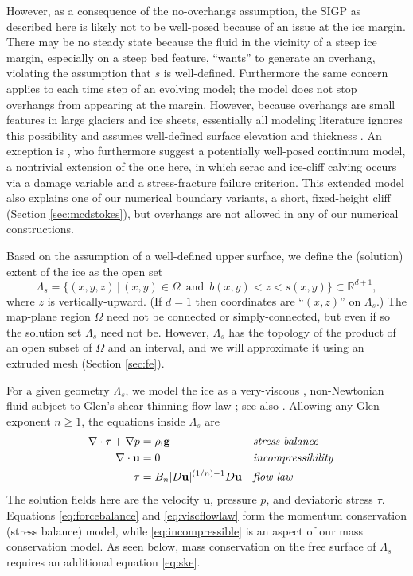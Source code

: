 \documentclass[letterpaper,final,12pt,reqno]{amsart}
\theoremstyle{claim}
\newcommand{\RR}{\mathbb{R}}
\newcommand{\bg}{\mathbf{g}}
\newcommand{\bu}{\mathbf{u}}
\newcommand{\rhoi}{\rho_{\text{i}}}
\numberwithin{equation}{section}
\numberwithin{figure}{section}
\numberwithin{table}{section}
\numberwithin{theorem}{section}
\begin{document}
However, as a consequence of the no-overhangs assumption, the SIGP as described here is likely not to be well-posed because of an issue at the ice margin.  There may be no steady state because the fluid in the vicinity of a steep ice margin, especially on a steep bed feature, ``wants'' to generate an overhang, violating the assumption that $s$ is well-defined.  Furthermore the same concern applies to each time step of an evolving model; the model does not stop overhangs from appearing at the margin.  However, because overhangs are small features in large glaciers and ice sheets, essentially all modeling literature ignores this possibility and assumes well-defined surface elevation and thickness \cite{Jouvetetal2008,Lengetal2012,WirbelJarosch2020}.  An exception is \cite{PralongFunk2005}, who furthermore suggest a potentially well-posed continuum model, a nontrivial extension of the one here, in which serac and ice-cliff calving occurs via a damage variable and a stress-fracture failure criterion.  This extended model also explains one of our numerical boundary variants, a short, fixed-height cliff (Section \ref{sec:mcdstokes}), but overhangs are not allowed in any of our numerical constructions.

Based on the assumption of a well-defined upper surface, we define the (solution) extent of the ice as the open set
\begin{equation}
\Lambda_s = \{(x,y,z)\,|\,(x,y) \in \Omega \,\text{ and }\, b(x,y) < z < s(x,y)\}  \subset \RR^{d+1}, \label{eq:lambdas}
\end{equation}
where $z$ is vertically-upward.  (If $d=1$ then coordinates are ``$(x,z)$'' on $\Lambda_s$.)  The map-plane region $\Omega$ need not be connected or simply-connected, but even if so the solution set $\Lambda_s$ need not be.  However, $\Lambda_s$ has the topology of the product of an open subset of $\Omega$ and an interval, and we will approximate it using an extruded mesh (Section \ref{sec:fe}).

For a given geometry $\Lambda_s$, we model the ice as a very-viscous \cite{Acheson1990}, non-Newtonian fluid subject to Glen's shear-thinning flow law \cite{GreveBlatter2009}; see also \cite[Chapter 1]{FowlerNg2021}.  Allowing any Glen exponent $n\ge 1$, the equations inside $\Lambda_s$ are
\begin{align}
- \nabla \cdot \tau + \nabla p &= \rhoi \bg &&\text{\emph{stress balance}} \label{eq:forcebalance} \\
\nabla \cdot \bu &= 0 &&\text{\emph{incompressibility}} \label{eq:incompressible} \\
\tau &= B_n |D\bu|^{(1/n) - 1} D\bu  &&\text{\emph{flow law}} \label{eq:viscflowlaw}
\end{align}
The solution fields here are the velocity $\bu$, pressure $p$, and deviatoric stress $\tau$.  Equations \eqref{eq:forcebalance} and \eqref{eq:viscflowlaw} form the momentum conservation (stress balance) model, while \eqref{eq:incompressible} is an aspect of our mass conservation model.  As seen below, mass conservation on the free surface of $\Lambda_s$ requires an additional equation \eqref{eq:ske}.
\end{document}

